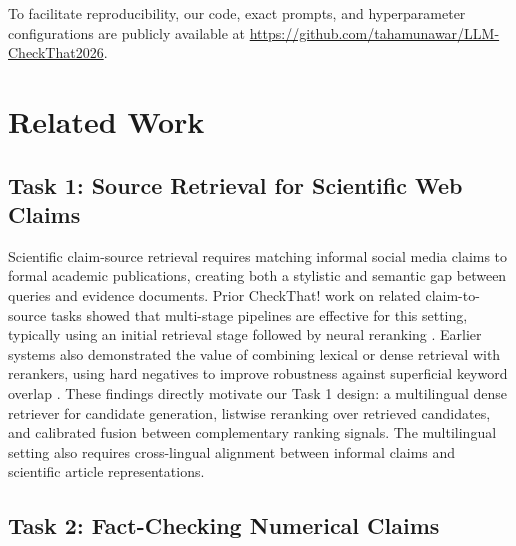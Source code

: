 \documentclass[
]{ceurart}
\begin{document}
To facilitate reproducibility, our code, exact prompts, and hyperparameter configurations are publicly available at \url{https://github.com/tahamunawar/LLM-CheckThat2026}.

\section{Related Work}

\subsection{Task 1: Source Retrieval for Scientific Web Claims}

Scientific claim-source retrieval requires matching informal social media claims to formal academic publications, creating both a stylistic and semantic gap between queries and evidence documents. Prior CheckThat! work on related claim-to-source tasks showed that multi-stage pipelines are effective for this setting, typically using an initial retrieval stage followed by neural reranking \cite{hafid2025overview}. Earlier systems also demonstrated the value of combining lexical or dense retrieval with rerankers, using hard negatives to improve robustness against superficial keyword overlap \cite{staudinger2025atom, sager2025deep, thapliyal2025scire, ashbaugh2025airwaves}. These findings directly motivate our Task 1 design: a multilingual dense retriever for candidate generation, listwise reranking over retrieved candidates, and calibrated fusion between complementary ranking signals. The multilingual setting also requires cross-lingual alignment between informal claims and scientific article representations.

\subsection{Task 2: Fact-Checking Numerical Claims}
\end{document}
